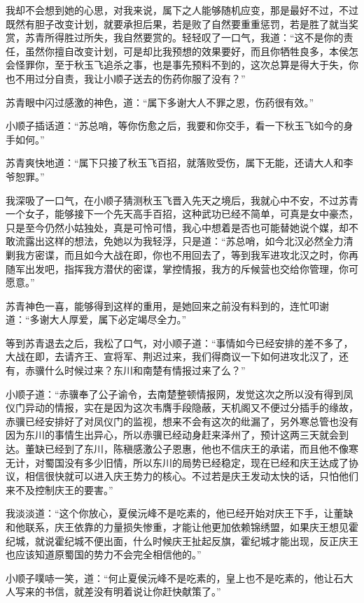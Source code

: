 我却不会想到她的心思，对我来说，属下之人能够随机应变，那是最好不过，不过既然有胆子改变计划，就要承担后果，若是败了自然要重重惩罚，若是胜了就当奖赏，苏青所得胜过所失，我自然要赏的。轻轻叹了一口气，我道：“这不是你的责任，虽然你擅自改变计划，可是却比我预想的效果要好，而且你牺牲良多，本侯怎会怪罪你，至于秋玉飞追杀之事，也是事先预料不到的，这次总算是得大于失，你也不用过分自责，我让小顺子送去的伤药你服了没有？”

苏青眼中闪过感激的神色，道：“属下多谢大人不罪之恩，伤药很有效。”

小顺子插话道：“苏总哨，等你伤愈之后，我要和你交手，看一下秋玉飞如今的身手如何。”

苏青爽快地道：“属下只接了秋玉飞百招，就落败受伤，属下无能，还请大人和李爷恕罪。”

我深吸了一口气，在小顺子猜测秋玉飞晋入先天之境后，我就心中不安，不过苏青一个女子，能够接下一个先天高手百招，这种武功已经不简单，可真是女中豪杰，只是至今仍然小姑独处，真是可怜可惜，我心中想着是否也可能替她说个媒，却不敢流露出这样的想法，免她以为我轻浮，只是道：“苏总哨，如今北汉必然全力清剿我方密谍，而且如今大战在即，你也不用回去了，等到我军进攻北汉之时，你再随军出发吧，指挥我方潜伏的密谍，掌控情报，我方的斥候营也交给你管理，你可愿意。”

苏青神色一喜，能够得到这样的重用，是她回来之前没有料到的，连忙叩谢道：“多谢大人厚爱，属下必定竭尽全力。”

等到苏青退去之后，我松了口气，对小顺子道：“事情如今已经安排的差不多了，大战在即，去请齐王、宣将军、荆迟过来，我们得商议一下如何进攻北汉了，还有，赤骥什么时候过来？东川和南楚有情报过来了么？”

小顺子道：“赤骥奉了公子谕令，去南楚整顿情报网，发觉这次之所以没有得到凤仪门异动的情报，实在是因为这次韦膺手段隐蔽，天机阁又不便过分插手的缘故，赤骥已经安排好了对凤仪门的监视，想来不会有这次的纰漏了，另外寒总管也没有因为东川的事情生出异心，所以赤骥已经动身赶来泽州了，预计这两三天就会到达。董缺已经到了东川，陈稹感激公子恩惠，他也不信庆王的承诺，而且他不像寒无计，对蜀国没有多少旧情，所以东川的局势已经稳定，现在已经和庆王达成了协议，相信很快就可以进入庆王势力的核心。不过若是庆王发动太快的话，只怕他们来不及控制庆王的要害。”

我淡淡道：“这个你放心，夏侯沅峰不是吃素的，他已经开始对庆王下手，让董缺和他联系，庆王依靠的力量损失惨重，才能让他更加依赖锦绣盟，如果庆王想见霍纪城，就说霍纪城不便出面，什么时候庆王扯起反旗，霍纪城才能出现，反正庆王也应该知道原蜀国的势力不会完全相信他的。”

小顺子噗哧一笑，道：“何止夏侯沅峰不是吃素的，皇上也不是吃素的，他让石大人写来的书信，就差没有明着说让你赶快献策了。”

